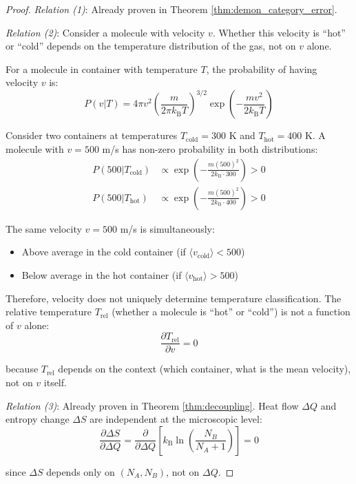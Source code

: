 \documentclass[10pt,twocolumn,letterpaper]{article}
\theoremstyle{definition}
\theoremstyle{remark}
\newcommand{\kb}{k_\text{B}}
\newcommand{\pderiv}[2]{\frac{\partial #1}{\partial #2}}
\begin{document}
\begin{proof}
\textit{Relation (1)}: Already proven in Theorem \ref{thm:demon_category_error}.

\textit{Relation (2)}: Consider a molecule with velocity $v$. Whether this velocity is ``hot'' or ``cold'' depends on the temperature distribution of the gas, not on $v$ alone.

For a molecule in container with temperature $T$, the probability of having velocity $v$ is:
\begin{equation}
P(v|T) = 4\pi v^2 \left(\frac{m}{2\pi \kb T}\right)^{3/2} \exp\left(-\frac{mv^2}{2\kb T}\right)
\end{equation}

Consider two containers at temperatures $T_{\text{cold}} = 300$ K and $T_{\text{hot}} = 400$ K. A molecule with $v = 500$ m/s has non-zero probability in both distributions:
\begin{align}
P(500|T_{\text{cold}}) &\propto \exp\left(-\frac{m(500)^2}{2\kb \cdot 300}\right) > 0 \\
P(500|T_{\text{hot}}) &\propto \exp\left(-\frac{m(500)^2}{2\kb \cdot 400}\right) > 0
\end{align}

The same velocity $v = 500$ m/s is simultaneously:
\begin{itemize}
\item Above average in the cold container (if $\langle v_{\text{cold}} \rangle < 500$)
\item Below average in the hot container (if $\langle v_{\text{hot}} \rangle > 500$)
\end{itemize}

Therefore, velocity does not uniquely determine temperature classification. The relative temperature $T_{\text{rel}}$ (whether a molecule is ``hot'' or ``cold'') is not a function of $v$ alone:
\begin{equation}
\pderiv{T_{\text{rel}}}{v} = 0
\end{equation}

because $T_{\text{rel}}$ depends on the context (which container, what is the mean velocity), not on $v$ itself.

\textit{Relation (3)}: Already proven in Theorem \ref{thm:decoupling}. Heat flow $\Delta Q$ and entropy change $\Delta S$ are independent at the microscopic level:
\begin{equation}
\pderiv{\Delta S}{\Delta Q} = \pderiv{}{\Delta Q}\left[\kb \ln\left(\frac{N_B}{N_A+1}\right)\right] = 0
\end{equation}

since $\Delta S$ depends only on $(N_A, N_B)$, not on $\Delta Q$.
\end{proof}
\end{document}
